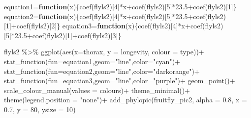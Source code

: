 \documentclass[
]{book}
\newenvironment{Shaded}{\begin{snugshade}}{\end{snugshade}}
\newcommand{\AttributeTok}[1]{\textcolor[rgb]{0.77,0.63,0.00}{#1}}
\newcommand{\ControlFlowTok}[1]{\textcolor[rgb]{0.13,0.29,0.53}{\textbf{#1}}}
\newcommand{\DecValTok}[1]{\textcolor[rgb]{0.00,0.00,0.81}{#1}}
\newcommand{\FloatTok}[1]{\textcolor[rgb]{0.00,0.00,0.81}{#1}}
\newcommand{\FunctionTok}[1]{\textcolor[rgb]{0.00,0.00,0.00}{#1}}
\newcommand{\NormalTok}[1]{#1}
\newcommand{\OtherTok}[1]{\textcolor[rgb]{0.56,0.35,0.01}{#1}}
\newcommand{\SpecialCharTok}[1]{\textcolor[rgb]{0.00,0.00,0.00}{#1}}
\newcommand{\StringTok}[1]{\textcolor[rgb]{0.31,0.60,0.02}{#1}}
\begin{document}
\begin{Shaded}
\begin{Highlighting}[]
\NormalTok{equation1}\OtherTok{=}\ControlFlowTok{function}\NormalTok{(x)\{}\FunctionTok{coef}\NormalTok{(flyls2)[}\DecValTok{4}\NormalTok{]}\SpecialCharTok{*}\NormalTok{x}\SpecialCharTok{+}\FunctionTok{coef}\NormalTok{(flyls2)[}\DecValTok{5}\NormalTok{]}\SpecialCharTok{*}\FloatTok{23.5}\SpecialCharTok{+}\FunctionTok{coef}\NormalTok{(flyls2)[}\DecValTok{1}\NormalTok{]\}}
\NormalTok{equation2}\OtherTok{=}\ControlFlowTok{function}\NormalTok{(x)\{}\FunctionTok{coef}\NormalTok{(flyls2)[}\DecValTok{4}\NormalTok{]}\SpecialCharTok{*}\NormalTok{x}\SpecialCharTok{+}\FunctionTok{coef}\NormalTok{(flyls2)[}\DecValTok{5}\NormalTok{]}\SpecialCharTok{*}\FloatTok{23.5}\SpecialCharTok{+}\FunctionTok{coef}\NormalTok{(flyls2)[}\DecValTok{1}\NormalTok{]}\SpecialCharTok{+}\FunctionTok{coef}\NormalTok{(flyls2)[}\DecValTok{2}\NormalTok{]\}}
\NormalTok{equation3}\OtherTok{=}\ControlFlowTok{function}\NormalTok{(x)\{}\FunctionTok{coef}\NormalTok{(flyls2)[}\DecValTok{4}\NormalTok{]}\SpecialCharTok{*}\NormalTok{x}\SpecialCharTok{+}\FunctionTok{coef}\NormalTok{(flyls2)[}\DecValTok{5}\NormalTok{]}\SpecialCharTok{*}\FloatTok{23.5}\SpecialCharTok{+}\FunctionTok{coef}\NormalTok{(flyls2)[}\DecValTok{1}\NormalTok{]}\SpecialCharTok{+}\FunctionTok{coef}\NormalTok{(flyls2)[}\DecValTok{3}\NormalTok{]\}}


\NormalTok{flyls2 }\SpecialCharTok{\%\textgreater{}\%} 
  \FunctionTok{ggplot}\NormalTok{(}\FunctionTok{aes}\NormalTok{(}\AttributeTok{x=}\NormalTok{thorax, }\AttributeTok{y =}\NormalTok{ longevity, }\AttributeTok{colour =}\NormalTok{ type))}\SpecialCharTok{+}
  \FunctionTok{stat\_function}\NormalTok{(}\AttributeTok{fun=}\NormalTok{equation1,}\AttributeTok{geom=}\StringTok{"line"}\NormalTok{,}\AttributeTok{color=}\StringTok{"cyan"}\NormalTok{)}\SpecialCharTok{+}
  \FunctionTok{stat\_function}\NormalTok{(}\AttributeTok{fun=}\NormalTok{equation2,}\AttributeTok{geom=}\StringTok{"line"}\NormalTok{,}\AttributeTok{color=}\StringTok{"darkorange"}\NormalTok{)}\SpecialCharTok{+}
  \FunctionTok{stat\_function}\NormalTok{(}\AttributeTok{fun=}\NormalTok{equation3,}\AttributeTok{geom=}\StringTok{"line"}\NormalTok{,}\AttributeTok{color=}\StringTok{"purple"}\NormalTok{)}\SpecialCharTok{+}
  \FunctionTok{geom\_point}\NormalTok{()}\SpecialCharTok{+}
  \FunctionTok{scale\_colour\_manual}\NormalTok{(}\AttributeTok{values =}\NormalTok{ colours)}\SpecialCharTok{+}
  \FunctionTok{theme\_minimal}\NormalTok{()}\SpecialCharTok{+}
  \FunctionTok{theme}\NormalTok{(}\AttributeTok{legend.position =} \StringTok{"none"}\NormalTok{)}\SpecialCharTok{+} 
  \FunctionTok{add\_phylopic}\NormalTok{(fruitfly\_pic2, }\AttributeTok{alpha =} \FloatTok{0.8}\NormalTok{, }\AttributeTok{x =} \FloatTok{0.7}\NormalTok{, }\AttributeTok{y =} \DecValTok{80}\NormalTok{, }\AttributeTok{ysize =} \DecValTok{10}\NormalTok{)}
\end{Highlighting}
\end{Shaded}
\end{document}

